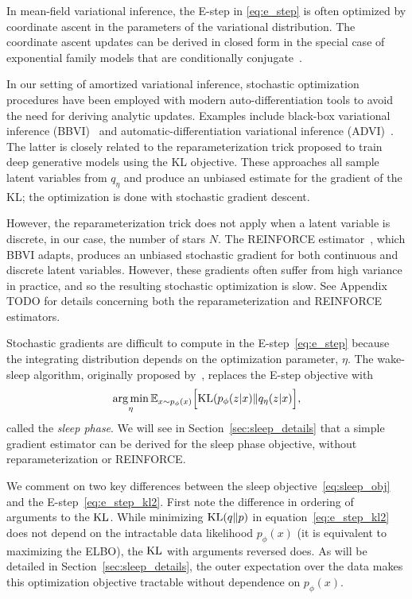 In mean-field variational inference, the E-step in \eqref{eq:e_step} is often optimized by coordinate ascent in the parameters of the variational distribution. 
The coordinate ascent updates can be derived in closed form in the special case of exponential family models that are conditionally conjugate~\cite{Blei_2017_vi_review}. 

In our setting of amortized variational inference, stochastic 
optimization procedures have been employed with modern 
auto-differentiation tools to avoid the need for deriving 
analytic updates. Examples include black-box variational inference (BBVI)~\cite{ranganath2013black} 
and automatic-differentiation variational inference (ADVI)~\cite{kucukelbir2016automatic}. The latter 
is closely related to the reparameterization trick \cite{kingma2013autoencoding, rezende2014stochastic} proposed to train deep generative models using the KL objective. 
These approaches all sample latent variables from $q_\eta$ and produce an unbiased estimate 
for the gradient of the KL; the optimization is done with stochastic gradient descent. 

However, the reparameterization trick does not apply when a latent variable is discrete, in our case, the number of stars $N$. The REINFORCE estimator~\cite{Williams1992reinforce}, which BBVI adapts, produces an unbiased stochastic gradient for both continuous and discrete latent variables. However, these gradients often suffer from high variance in practice, and so the resulting stochastic optimization is slow. See Appendix TODO for details concerning both the reparameterization and REINFORCE estimators. 

Stochastic gradients are difficult to compute in the E-step~\eqref{eq:e_step} because the integrating distribution depends on the optimization parameter, $\eta$. 
The wake-sleep algorithm, originally proposed by~\cite{Hinton1995wake_sleep}, replaces the 
E-step objective with 
\begin{align}
    \operatorname*{arg\,min}_{\eta} \mathbb{E}_{x \sim p_\phi(x)}\Big[\textrm{KL}(p_\phi(z | x) \| q_\eta(z | x)\Big]
    \label{eq:sleep_obj},
\end{align}
called the {\itshape sleep phase}. We will see in Section~\ref{sec:sleep_details} that a simple gradient estimator can be derived for the sleep phase objective, without 
reparameterization or REINFORCE. 

We comment on two key differences between the sleep objective~\eqref{eq:sleep_obj} and the E-step~\eqref{eq:e_step_kl2}. First note the difference in ordering of arguments to the $\textrm{KL}$. 
While minimizing $\textrm{KL}(q\|p)$ in equation~\eqref{eq:e_step_kl2} does not depend on the intractable 
data likelihood $p_\phi(x)$ (it is equivalent to maximizing the ELBO), the $\textrm{KL}$ with arguments reversed does. 
As will be detailed in Section~\ref{sec:sleep_details}, the outer expectation over the data makes this optimization objective tractable without dependence on $p_\phi(x)$. 

